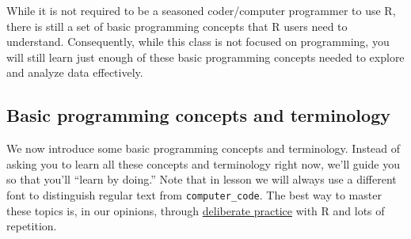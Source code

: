 \documentclass[]{book}
\begin{document}
While it is not required to be a seasoned coder/computer programmer to use R, there is still a set of basic programming concepts that R users need to understand. Consequently, while this class is not focused on programming, you will still learn just enough of these basic programming concepts needed to explore and analyze data effectively.

\hypertarget{programming-concepts}{%
\subsection{Basic programming concepts and terminology}\label{programming-concepts}}

We now introduce some basic programming concepts and terminology. Instead of asking you to learn all these concepts and terminology right now, we'll guide you so that you'll ``learn by doing.'' Note that in lesson we will always use a different font to distinguish regular text from \texttt{computer\_code}. The best way to master these topics is, in our opinions, through \href{https://jamesclear.com/deliberate-practice-theory}{deliberate practice} with R and lots of repetition.
\end{document}
